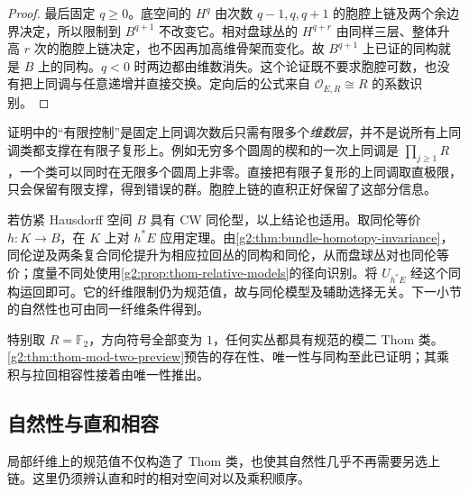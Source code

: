 \begin{proof}
	最后固定 \(q\ge0\)。底空间的 \(H^q\) 由次数 \(q-1,q,q+1\) 的胞腔上链及两个余边界决定，所以限制到 \(B^{q+1}\) 不改变它。相对盘球丛的 \(H^{q+r}\) 由同样三层、整体升高 \(r\) 次的胞腔上链决定，也不因再加高维骨架而变化。故 \(B^{q+1}\) 上已证的同构就是 \(B\) 上的同构。\(q<0\) 时两边都由维数消失。这个论证既不要求胞腔可数，也没有把上同调与任意递增并直接交换。定向后的公式来自 \(\mathcal O_{E,R}\cong R\) 的系数识别。
\end{proof}

证明中的“有限控制”是固定上同调次数后只需有限多个\emph{维数层}，并不是说所有上同调类都支撑在有限子复形上。例如无穷多个圆周的楔和的一次上同调是 \(\prod_{j\ge1}R\)，一个类可以同时在无限多个圆周上非零。直接把有限子复形的上同调取直极限，只会保留有限支撑，得到错误的群。胞腔上链的直积正好保留了这部分信息。

\ProseParagraphBreak

若仿紧 Hausdorff 空间 \(B\) 具有 CW 同伦型，以上结论也适用。取同伦等价 \(h:K\to B\)，在 \(K\) 上对 \(h^*E\) 应用定理。由\cref{g2:thm:bundle-homotopy-invariance}，同伦逆及两条复合同伦提升为相应拉回丛的同构和同伦，从而盘球丛对也同伦等价；度量不同处使用\cref{g2:prop:thom-relative-models}的径向识别。将 \(U_{h^*E}\) 经这个同构运回即可。它的纤维限制仍为规范值，故与同伦模型及辅助选择无关。下一小节的自然性也可由同一纤维条件得到。

特别取 \(R=\mathbb F_2\)，方向符号全部变为 \(1\)，任何实丛都具有规范的模二 Thom 类。\cref{g2:thm:thom-mod-two-preview}预告的存在性、唯一性与同构至此已证明；其乘积与拉回相容性接着由唯一性推出。

\subsection{自然性与直和相容}
\label{g2:subsec:2002:04}
局部纤维上的规范值不仅构造了 Thom 类，也使其自然性几乎不再需要另选上链。这里仍须辨认直和时的相对空间对以及乘积顺序。

